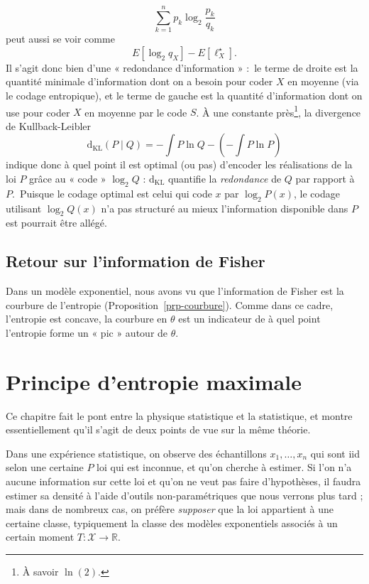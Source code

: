 \documentclass[
  10,
  letterpaper,
  DIV=11,
  numbers=noendperiod]{scrreport}
\newcommand{\dkl}{\mathrm{d}_{\mathrm{KL}}}
\theoremstyle{plain}
\theoremstyle{definition}
\theoremstyle{plain}
\theoremstyle{definition}
\theoremstyle{definition}
\theoremstyle{plain}
\theoremstyle{remark}
\begin{document}
\[\sum_{k=1}^n p_k \log_2\frac{p_k}{q_k}\] peut aussi se voir comme
\[E[\log_2 q_X] - E[\ell_X^\star].\] Il s'agit donc bien d'une «
redondance d'information » :~le terme de droite est la quantité minimale
d'information dont on a besoin pour coder \(X\) en moyenne (via le
codage entropique), et le terme de gauche est la quantité d'information
dont on use pour coder \(X\) en moyenne par le code \(S\). À une
constante près\footnote{À savoir \(\ln(2)\).}, la divergence de
Kullback-Leibler
\[ \dkl(P\mid Q) =  - \int P \ln Q - \left( - \int P \ln P \right)\]
indique donc à quel point il est optimal (ou pas) d'encoder les
réalisations de la loi \(P\) grâce au « code » \(\log_2 Q\) : \(\dkl\)
quantifie la \emph{redondance} de \(Q\) par rapport à \(P\).~Puisque le
codage optimal est celui qui code \(x\) par \(\log_2 P(x)\), le codage
utilisant \(\log_2 Q(x)\) n'a pas structuré au mieux l'information
disponible dans \(P\) est pourrait être allégé.

\hypertarget{retour-sur-linformation-de-fisher}{%
\section{Retour sur l'information de
Fisher}\label{retour-sur-linformation-de-fisher}}

Dans un modèle exponentiel, nous avons vu que l'information de Fisher
est la courbure de l'entropie (Proposition~\ref{prp-courbure}). Comme
dans ce cadre, l'entropie est concave, la courbure en \(\theta\) est un
indicateur de à quel point l'entropie forme un « pic » autour de
\(\theta\).


\hypertarget{principe-dentropie-maximale}{%
\chapter{Principe d'entropie
maximale}\label{principe-dentropie-maximale}}

Ce chapitre fait le pont entre la physique statistique et la
statistique, et montre essentiellement qu'il s'agit de deux points de
vue sur la même théorie.

Dans une expérience statistique, on observe des échantillons
\(x_1, \dotsc, x_n\) qui sont iid selon une certaine \(P\) loi qui est
inconnue, et qu'on cherche à estimer. Si l'on n'a aucune information sur
cette loi et qu'on ne veut pas faire d'hypothèses, il faudra estimer sa
densité à l'aide d'outils non-paramétriques que nous verrons plus tard ;
mais dans de nombreux cas, on préfère \emph{supposer} que la loi
appartient à une certaine classe, typiquement la classe des modèles
exponentiels associés à un certain moment
\(T:\mathcal{X}\to\mathbb{R}\).
\end{document}
